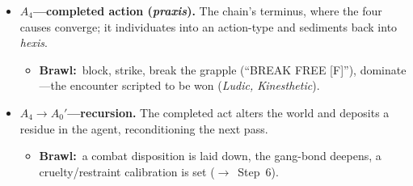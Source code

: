 \documentclass[11pt]{article}
\newcommand{\inb}{\textbf{Brawl:}~}
\newcommand{\too}{\ensuremath{\to}}
\begin{document}
\begin{itemize}
  \item \textbf{$A_4$---completed action (\emph{praxis}).} The chain's terminus, where the four causes converge; it individuates into an action-type and sediments back into \textit{hexis}.
    \begin{itemize}\item \inb block, strike, break the grapple (``BREAK FREE [F]''), dominate---the encounter scripted to be won (\emph{Ludic, Kinesthetic}).\end{itemize}
  \item \textbf{$A_4\too A_0'$---recursion.} The completed act alters the world and deposits a residue in the agent, reconditioning the next pass.
    \begin{itemize}\item \inb a combat disposition is laid down, the gang-bond deepens, a cruelty/restraint calibration is set (\too\ Step~6).\end{itemize}
\end{itemize}
\end{document}
